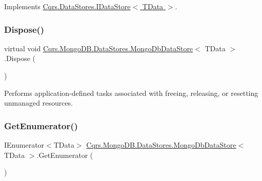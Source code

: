 Implements \hyperlink{interfaceCqrs_1_1DataStores_1_1IDataStore_aa7ade96f2f3151d5353cf7bdbb2baec5}{Cqrs.\+Data\+Stores.\+I\+Data\+Store$<$ T\+Data $>$}.

\mbox{\label{classCqrs_1_1MongoDB_1_1DataStores_1_1MongoDbDataStore_a5003aba35b02f686cbacf5832a14cf46}} 
\subsubsection{\texorpdfstring{Dispose()}{Dispose()}}
{\footnotesize\ttfamily virtual void \hyperlink{classCqrs_1_1MongoDB_1_1DataStores_1_1MongoDbDataStore}{Cqrs.\+Mongo\+D\+B.\+Data\+Stores.\+Mongo\+Db\+Data\+Store}$<$ T\+Data $>$.Dispose (\begin{DoxyParamCaption}{ }\end{DoxyParamCaption})\hspace{0.3cm}{\ttfamily [virtual]}}



Performs application-\/defined tasks associated with freeing, releasing, or resetting unmanaged resources. 

\mbox{\label{classCqrs_1_1MongoDB_1_1DataStores_1_1MongoDbDataStore_a2bab987d4d7f3c6b2ab3a3e04878cf98}} 
\subsubsection{\texorpdfstring{Get\+Enumerator()}{GetEnumerator()}}
{\footnotesize\ttfamily I\+Enumerator$<$T\+Data$>$ \hyperlink{classCqrs_1_1MongoDB_1_1DataStores_1_1MongoDbDataStore}{Cqrs.\+Mongo\+D\+B.\+Data\+Stores.\+Mongo\+Db\+Data\+Store}$<$ T\+Data $>$.Get\+Enumerator (\begin{DoxyParamCaption}{ }\end{DoxyParamCaption})}



